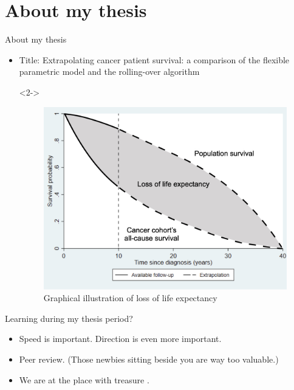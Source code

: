 \documentclass{beamer}
\begin{document}
\section{About my thesis}
\begin{frame}{About my thesis}

\begin{itemize}
	\item<1-> Title: Extrapolating cancer patient survival: a comparison of the flexible parametric model and the rolling-over algorithm	
	
	\item[]<2->\begin{figure}
	\begin{center}
	\includegraphics[scale=0.18]{image/LLE_edit}
	\caption{\centering Graphical illustration of loss of life expectancy}
	\end{center}
\end{figure}
\end{itemize}
\end{frame}


\begin{frame}{Learning during my thesis period?}

\begin{itemize}
	\item <1->  Speed is important. Direction is even more important.
	\item <2-> Peer review. (Those newbies sitting beside you are way too valuable.)
	\item <3-> We are at the place with treasure	.
\end{itemize}
\end{frame}
\end{document}
